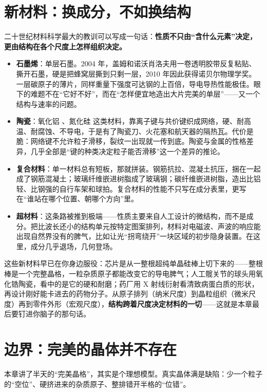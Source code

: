 \section{新材料：换成分，不如换结构}

二十世纪材料科学最大的教训可以写成一句话：\textbf{性质不只由“含什么元素”决定，更由结构在各个尺度上怎样组织决定。}

\begin{itemize}[itemsep=2pt]
\item \textbf{石墨烯}：单层石墨。2004 年，盖姆和诺沃肖洛夫用一卷透明胶带反复粘贴、撕开石墨，硬是把蜂窝层撕到只剩一层，2010 年因此获得诺贝尔物理学奖。一层碳原子的薄片，同样重量下强度可达钢的上百倍，导电导热性能极佳。眼下的难题不在“它好不好”，而在“怎样便宜地造出大片完美的单层”——又一个结构与速率的问题。
\item \textbf{陶瓷}：氧化铝 、氮化硅  这类材料，靠离子键与共价键织成网络，硬、耐高温、耐腐蚀、不导电，于是有了陶瓷刀、火花塞和航天器的隔热瓦。代价是脆：网络键不允许粒子滑移，裂纹一出现就一传到底。陶瓷与金属的性格差异，几乎全部是“键的种类决定粒子能否滑移”这一个差异的推论。
\item \textbf{复合材料}：单一材料总有短板，那就拼装。钢筋抗拉、混凝土抗压，捆在一起成了钢筋混凝土；玻璃纤维嵌进树脂成了玻璃钢；碳纤维嵌进树脂，造出比铝轻、比钢强的自行车架和球拍。复合材料的性能不只写在成分表里，更写在“谁站在哪个位置、朝哪个方向”里。
\item \textbf{超材料}：这条路被推到极端——性质主要来自人工设计的微结构，而不是成分。把比波长还小的结构单元按特定图案排列，材料对电磁波、声波的响应能出现自然界没有的脾气，比如让光“拐弯绕开”一块区域的初步隐身装置。在这里，成分几乎退场，几何登场。
\end{itemize}

这些新材料早已在你身边服役：芯片是从一整根超纯单晶硅棒上切下来的——整根棒是一个完整晶格，一粒杂质原子都能改变它的导电脾气；人工髋关节的球头用氧化锆陶瓷，看中的是它的硬和耐磨；药厂用 X 射线衍射看清致病蛋白质的形状，再设计刚好能卡进去的药物分子。从原子排列（纳米尺度）到晶粒组织（微米尺度）再到零件外形（宏观尺度），\textbf{结构跨着尺度决定材料的一切}——这就是本章最后要钉进你脑子的那句话。

\section{边界：完美的晶体并不存在}

本章讲了半天的“完美晶格”，其实是个理想模型。真实晶体满是缺陷：少一个粒子的“空位”、硬挤进来的杂质原子、整排错开半格的“位错”。

